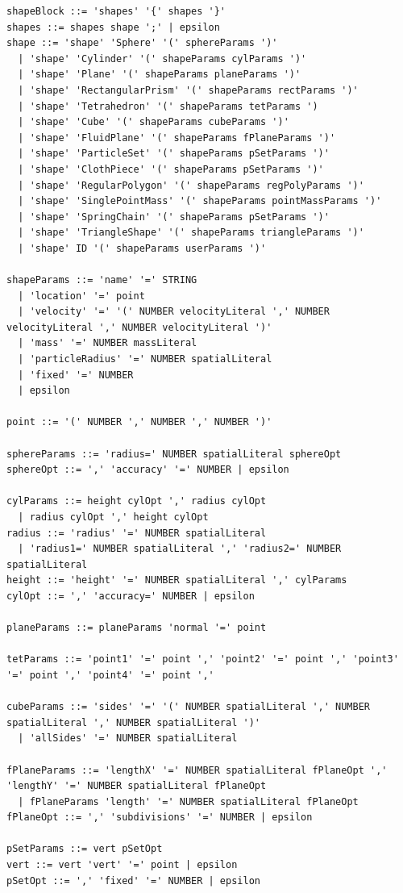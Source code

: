 \begin{verbatim}
shapeBlock ::= 'shapes' '{' shapes '}'
shapes ::= shapes shape ';' | epsilon
shape ::= 'shape' 'Sphere' '(' sphereParams ')' 
  | 'shape' 'Cylinder' '(' shapeParams cylParams ')' 
  | 'shape' 'Plane' '(' shapeParams planeParams ')' 
  | 'shape' 'RectangularPrism' '(' shapeParams rectParams ')' 
  | 'shape' 'Tetrahedron' '(' shapeParams tetParams ') 
  | 'shape' 'Cube' '(' shapeParams cubeParams ')'
  | 'shape' 'FluidPlane' '(' shapeParams fPlaneParams ')'
  | 'shape' 'ParticleSet' '(' shapeParams pSetParams ')'
  | 'shape' 'ClothPiece' '(' shapeParams pSetParams ')'
  | 'shape' 'RegularPolygon' '(' shapeParams regPolyParams ')'
  | 'shape' 'SinglePointMass' '(' shapeParams pointMassParams ')'
  | 'shape' 'SpringChain' '(' shapeParams pSetParams ')'
  | 'shape' 'TriangleShape' '(' shapeParams triangleParams ')'
  | 'shape' ID '(' shapeParams userParams ')' 

shapeParams ::= 'name' '=' STRING
  | 'location' '=' point
  | 'velocity' '=' '(' NUMBER velocityLiteral ',' NUMBER velocityLiteral ',' NUMBER velocityLiteral ')'
  | 'mass' '=' NUMBER massLiteral
  | 'particleRadius' '=' NUMBER spatialLiteral
  | 'fixed' '=' NUMBER
  | epsilon

point ::= '(' NUMBER ',' NUMBER ',' NUMBER ')'

sphereParams ::= 'radius=' NUMBER spatialLiteral sphereOpt
sphereOpt ::= ',' 'accuracy' '=' NUMBER | epsilon

cylParams ::= height cylOpt ',' radius cylOpt 
  | radius cylOpt ',' height cylOpt
radius ::= 'radius' '=' NUMBER spatialLiteral
  | 'radius1=' NUMBER spatialLiteral ',' 'radius2=' NUMBER spatialLiteral 
height ::= 'height' '=' NUMBER spatialLiteral ',' cylParams
cylOpt ::= ',' 'accuracy=' NUMBER | epsilon

planeParams ::= planeParams 'normal '=' point

tetParams ::= 'point1' '=' point ',' 'point2' '=' point ',' 'point3' '=' point ',' 'point4' '=' point ','

cubeParams ::= 'sides' '=' '(' NUMBER spatialLiteral ',' NUMBER spatialLiteral ',' NUMBER spatialLiteral ')'
  | 'allSides' '=' NUMBER spatialLiteral

fPlaneParams ::= 'lengthX' '=' NUMBER spatialLiteral fPlaneOpt ',' 'lengthY' '=' NUMBER spatialLiteral fPlaneOpt
  | fPlaneParams 'length' '=' NUMBER spatialLiteral fPlaneOpt
fPlaneOpt ::= ',' 'subdivisions' '=' NUMBER | epsilon

pSetParams ::= vert pSetOpt
vert ::= vert 'vert' '=' point | epsilon
pSetOpt ::= ',' 'fixed' '=' NUMBER | epsilon


\end{verbatim}
